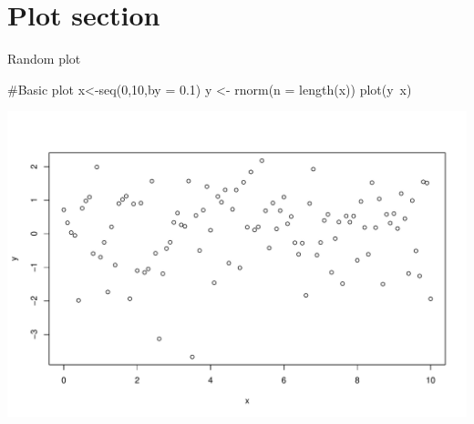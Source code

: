 \documentclass[ignorenonframetext,]{beamer}
\newenvironment{Shaded}{}{}
\newcommand{\KeywordTok}[1]{\textcolor[rgb]{0.00,0.00,1.00}{#1}}
\newcommand{\DataTypeTok}[1]{#1}
\newcommand{\DecValTok}[1]{#1}
\newcommand{\FloatTok}[1]{#1}
\newcommand{\StringTok}[1]{\textcolor[rgb]{0.00,0.50,0.50}{#1}}
\newcommand{\CommentTok}[1]{\textcolor[rgb]{0.00,0.50,0.00}{#1}}
\newcommand{\OperatorTok}[1]{#1}
\newcommand{\NormalTok}[1]{#1}
\begin{document}
\section{Plot section}\label{plot-section}

\begin{frame}[fragile]{Random plot}

\scriptsize

\begin{Shaded}
\begin{Highlighting}[]
\CommentTok{#Basic plot}
\NormalTok{x<-}\KeywordTok{seq}\NormalTok{(}\DecValTok{0}\NormalTok{,}\DecValTok{10}\NormalTok{,}\DataTypeTok{by =} \FloatTok{0.1}\NormalTok{)}
\NormalTok{y <-}\StringTok{ }\KeywordTok{rnorm}\NormalTok{(}\DataTypeTok{n =} \KeywordTok{length}\NormalTok{(x))}
\KeywordTok{plot}\NormalTok{(y}\OperatorTok{~}\NormalTok{x)}
\end{Highlighting}
\end{Shaded}

\includegraphics{rnwExample_files/figure-beamer/unnamed-chunk-2-1.pdf}

\end{frame}

\end{document}
